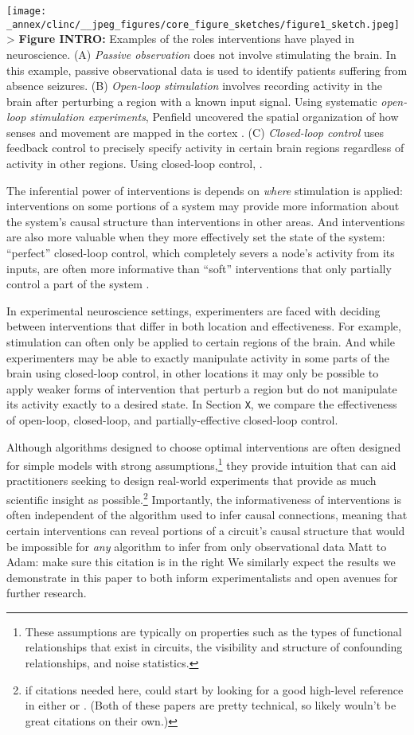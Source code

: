 \texttt{[image: \_annex/clinc/\_\_jpeg\_figures/core\_figure\_sketches/figure1\_sketch.jpeg]}
\textgreater{} \textbf{Figure INTRO:} Examples of the roles
interventions have played in neuroscience. (A) \emph{Passive
observation} does not involve stimulating the brain. In this example,
passive observational data is used to identify patients suffering from
absence seizures. (B) \emph{Open-loop stimulation} involves recording
activity in the brain after perturbing a region with a known input
signal. Using systematic \emph{open-loop stimulation experiments},
Penfield uncovered the spatial organization of how senses and movement
are mapped in the cortex . (C) \emph{Closed-loop control} uses feedback
control to precisely specify activity in certain brain regions
regardless of activity in other regions. Using closed-loop control, .

The inferential power of interventions is depends on \emph{where}
stimulation is applied: interventions on some portions of a system may
provide more information about the system's causal structure than
interventions in other areas. And interventions are also more valuable
when they more effectively set the state of the system: ``perfect''
closed-loop control, which completely severs a node's activity from its
inputs, are often more informative than ``soft'' interventions that only
partially control a part of the system .

In experimental neuroscience settings, experimenters are faced with
deciding between interventions that differ in both location and
effectiveness. For example, stimulation can often only be applied to
certain regions of the brain. And while experimenters may be able to
exactly manipulate activity in some parts of the brain using closed-loop
control, in other locations it may only be possible to apply weaker
forms of intervention that perturb a region but do not manipulate its
activity exactly to a desired state. In Section \texttt{X}, we compare
the effectiveness of open-loop, closed-loop, and partially-effective
closed-loop control.

Although algorithms designed to choose optimal interventions are often
designed for simple models with strong assumptions,\footnote{These
  assumptions are typically on properties such as the types of
  functional relationships that exist in circuits, the visibility and
  structure of confounding relationships, and noise statistics.} they
provide intuition that can aid practitioners seeking to design
real-world experiments that provide as much scientific insight as
possible.\footnote{if citations needed here, could start by looking for
  a good high-level reference in either or . (Both of these papers are
  pretty technical, so likely wouln't be great citations on their own.)}
Importantly, the informativeness of interventions is often independent
of the algorithm used to infer causal connections, meaning that certain
interventions can reveal portions of a circuit's causal structure that
would be impossible for \emph{any} algorithm to infer from only
observational data Matt to Adam: make sure this citation is in the right
We similarly expect the results we demonstrate in this paper to both
inform experimentalists and open avenues for further research.

